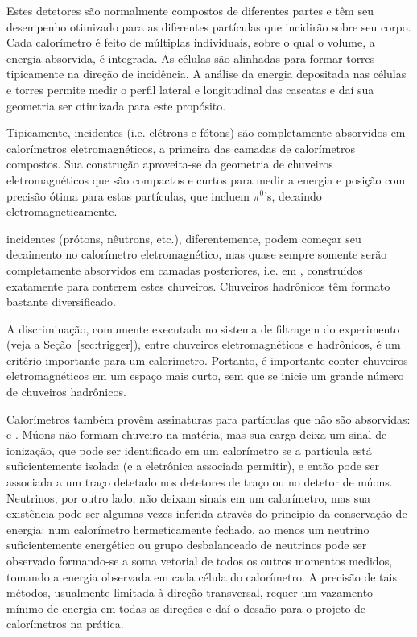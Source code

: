 Estes detetores são normalmente compostos de diferentes partes e têm seu
desempenho otimizado para as diferentes partículas que incidirão sobre seu
corpo. Cada calorímetro é feito de múltiplas  individuais, sobre
o qual o volume, a energia absorvida, é integrada. As células são alinhadas
para formar torres tipicamente na direção de incidência. A análise da energia
depositada nas células e torres permite medir o perfil lateral e longitudinal
das cascatas e daí sua geometria ser otimizada para este propósito.

Tipicamente,  incidentes (i.e. elétrons e
fótons) são completamente absorvidos em calorímetros eletromagnéticos, a
primeira das camadas de calorímetros compostos. Sua construção aproveita-se da
geometria de chuveiros eletromagnéticos que são compactos e curtos para medir
a energia e posição com precisão ótima para estas partículas, que incluem
$\pi^{0}$'s, decaindo eletromagneticamente.

 incidentes (prótons, nêutrons, etc.), diferentemente,
podem começar seu decaimento no calorímetro eletromagnético, mas quase sempre
somente serão completamente absorvidos em camadas posteriores, i.e. em
, construídos exatamente para conterem estes
chuveiros. Chuveiros hadrônicos têm formato bastante diversificado.

A discriminação, comumente executada no sistema de filtragem do experimento
(veja a Seção~\ref{sec:trigger}), entre chuveiros eletromagnéticos e
hadrônicos, é um critério importante para um calorímetro. Portanto, é
importante conter chuveiros eletromagnéticos em um espaço mais curto, sem que
se inicie um grande número de chuveiros hadrônicos.

Calorímetros também provêm assinaturas para partículas que não são absorvidas:
 e . Múons não formam chuveiro na matéria, mas sua
carga deixa um sinal de ionização, que pode ser identificado em um
calorímetro se a partícula está suficientemente isolada (e a eletrônica
associada permitir), e então pode ser associada a um traço detetado nos
detetores de traço ou no detetor de múons. Neutrinos, por outro lado, não
deixam sinais em um calorímetro, mas sua existência pode ser algumas vezes
inferida através do princípio da conservação de energia: num calorímetro
hermeticamente fechado, ao menos um neutrino suficientemente energético ou
grupo desbalanceado de neutrinos pode ser observado formando-se a soma
vetorial de todos os outros momentos medidos, tomando a energia observada em
cada célula do calorímetro. A precisão de tais métodos, usualmente limitada à
direção transversal, requer um vazamento mínimo de energia em todas as
direções e daí o desafio para o projeto de calorímetros na prática.

